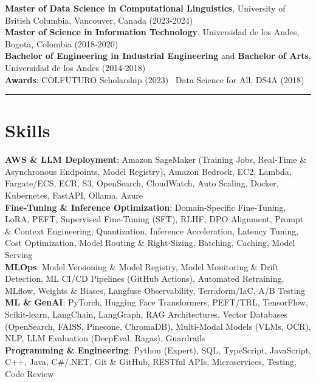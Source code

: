 \documentclass[9pt,a4paper]{extarticle}
\begin{document}
\textbf{Master of Data Science in Computational Linguistics}, University of British Columbia, Vancouver, Canada (2023-2024)\\
\textbf{Master of Science in Information Technology}, Universidad de los Andes, Bogota, Colombia (2018-2020)\\
\textbf{Bachelor of Engineering in Industrial Engineering} and \textbf{Bachelor of Arts}, Universidad de los Andes (2014-2018)\\
\textbf{Awards}: COLFUTURO Scholarship (2023) \textbar\ Data Science for All, DS4A (2018)

\rule{\textwidth}{0.4pt}

\section*{Skills}
\textbf{AWS \& LLM Deployment}: Amazon SageMaker (Training Jobs, Real-Time \& Asynchronous Endpoints, Model Registry), Amazon Bedrock, EC2, Lambda, Fargate/ECS, ECR, S3, OpenSearch, CloudWatch, Auto Scaling, Docker, Kubernetes, FastAPI, Ollama, Azure\\
\textbf{Fine-Tuning \& Inference Optimization}: Domain-Specific Fine-Tuning, LoRA, PEFT, Supervised Fine-Tuning (SFT), RLHF, DPO Alignment, Prompt \& Context Engineering, Quantization, Inference Acceleration, Latency Tuning, Cost Optimization, Model Routing \& Right-Sizing, Batching, Caching, Model Serving\\
\textbf{MLOps}: Model Versioning \& Model Registry, Model Monitoring \& Drift Detection, ML CI/CD Pipelines (GitHub Actions), Automated Retraining, MLflow, Weights \& Biases, Langfuse Observability, Terraform/IaC, A/B Testing\\
\textbf{ML \& GenAI}: PyTorch, Hugging Face Transformers, PEFT/TRL, TensorFlow, Scikit-learn, LangChain, LangGraph, RAG Architectures, Vector Databases (OpenSearch, FAISS, Pinecone, ChromaDB), Multi-Modal Models (VLMs, OCR), NLP, LLM Evaluation (DeepEval, Ragas), Guardrails\\
\textbf{Programming \& Engineering}: Python (Expert), SQL, TypeScript, JavaScript, C++, Java, C\#/.NET, Git \& GitHub, RESTful APIs, Microservices, Testing, Code Review
\end{document}
